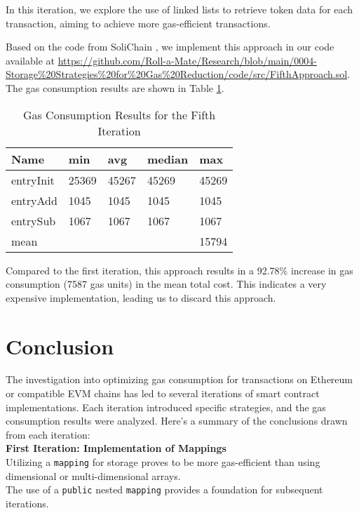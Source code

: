 \documentclass[fleqn,10pt]{olplainarticle}
\begin{document}
In this iteration, we explore the use of linked lists to retrieve token data for each transaction, aiming to achieve more gas-efficient transactions.

Based on the code from SoliChain \cite{boudjemaa_elevate_2023}, we implement this approach in our code available at \url{https://github.com/Roll-a-Mate/Research/blob/main/0004-Storage%20Strategies%20for%20Gas%20Reduction/code/src/FifthApproach.sol}. The gas consumption results are shown in Table \ref{tab:FifthIT}.


\begin{table}[H]
	\centering
	\begin{tabular}{|l|l|l|l|l|}
		\hline
		Name       & min    & avg   & median &  max   \\ \hline
		entryInit  & 25369  & 45267 & 45269  &  45269 \\ \hline
		entryAdd   & 1045  	& 1045 	& 1045   &  1045   \\ \hline
		entrySub   & 1067  	& 1067 	& 1067   &  1067   \\ \hline
		mean       &\cellcolor{black}&\cellcolor{black}&\cellcolor{black}&15794\\ \hline
	\end{tabular}
	\caption{Gas Consumption Results for the Fifth Iteration}
	\label{tab:FifthIT}
\end{table}

Compared to the first iteration, this approach results in a 92.78\% increase in gas consumption (7587 gas units) in the mean total cost. This indicates a very expensive implementation, leading us to discard this approach.

\section{Conclusion}

The investigation into optimizing gas consumption for transactions on Ethereum or compatible EVM chains has led to several iterations of smart contract implementations. Each iteration introduced specific strategies, and the gas consumption results were analyzed. Here's a summary of the conclusions drawn from each iteration: \\

\textbf{First Iteration: Implementation of Mappings} \\
Utilizing a \texttt{mapping} for storage proves to be more gas-efficient than using dimensional or multi-dimensional arrays. \\
The use of a \texttt{public} nested \texttt{mapping} provides a foundation for subsequent iterations.
\end{document}
